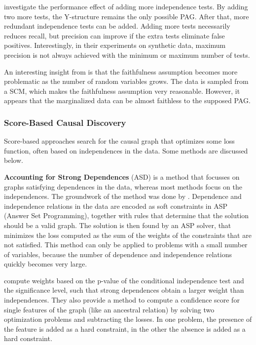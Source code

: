 \citet{mooij2015empirical} investigate the performance effect of adding more independence tests. By adding two more tests, the Y-structure remains the only possible PAG. After that, more redundant independence tests can be added. Adding more tests necessarily reduces recall, but precision can improve if the extra tests eliminate false positives. Interestingly, in their experiments on synthetic data, maximum precision is not always achieved with the minimum or maximum number of tests.

An interesting insight from \citet{mooij2015empirical} is that the faithfulness assumption becomes more problematic as the number of random variables grows. The data is sampled from a SCM, which makes the faithfulness assumption very reasonable. However, it appears that the marginalized data can be almost faithless to the supposed PAG. 

    
\subsubsection{Score-Based Causal Discovery}
Score-based approaches search for the causal graph that optimizes some loss function, often based on independences in the data. Some methods are discussed below.

\textbf{Accounting for Strong Dependences} (ASD) is a method that focusses on graphs satisfying dependences in the data, whereas most methods focus on the independences. The groundwork of the method was done by \citet{hyttinen2014constraint}. Dependence and independence relations in the data are encoded as soft constraints in ASP (Answer Set Programming), together with rules that determine that the solution should be a valid graph. The solution is then found by an ASP solver, that minimizes the loss computed as the sum of the weights of the constraints that are not satisfied. This method can only be applied to problems with a small number of variables, because the number of dependence and independence relations quickly becomes very large.

\citet{magliacane2016ancestral} compute weights based on the p-value of the conditional independence test and the significance level, such that strong dependences obtain a larger weight than independences. They also provide a method to compute a confidence score for single features of the graph (like an ancestral relation) by solving two optimization problems and subtracting the losses. In one problem, the presence of the feature is added as a hard constraint, in the other the absence is added as a hard constraint. 

